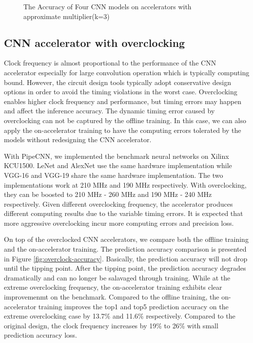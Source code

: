 \begin{figure}
        \center
        \qquad
        \caption{The Accuracy of Four CNN models on accelerators with approximate multiplier(k=3)}
        \label{fig:k3-approximate-mltiplier}
\end{figure}

\subsection{CNN accelerator with overclocking}
Clock frequency is almost proportional to the performance of the CNN accelerator 
especially for large convolution operation which is typically computing bound. 
However, the circuit design tools typically adopt conservative design options 
in order to avoid the timing violations in the worst case. Overclocking enables 
higher clock frequency and performance, but timing errors may happen and affect 
the inference accuracy. The dynamic timing error caused by overclocking 
can not be captured by the offline training. In this case, we can also apply the on-accelerator 
training to have the computing errors tolerated by the models without 
redesigning the CNN accelerator.

With PipeCNN, we implemented the benchmark neural networks on Xilinx KCU1500. 
LeNet and AlexNet use the same hardware implementation 
while VGG-16 and VGG-19 share the same hardware implementation. 
The two implementations work at 210 MHz and 190 MHz respectively.
With overclocking, they can be boosted to 210 MHz - 260 MHz and 
190 MHz - 240 MHz respectively. Given different overclocking frequency, 
the accelerator produces different computing results due to the variable
timing errors. It is expected that more aggressive overclocking incur 
more computing errors and precision loss. 

On top of the overclocked CNN accelerators, we compare both the offline training and the on-accelerator training.
The prediction accuracy comparison is presented in Figure \ref{fig:overclock-accuracy}. 
Basically, the prediction accuracy will not drop until the tipping point. After the tipping point, the 
prediction accuracy degrades dramatically and can no longer be salavaged through training.
While at the extreme overclocking frequency, the on-accelerator training exhibits clear 
improvemenmt on the benchmark. Compared to the offline training, 
the on-accelerator training improves the top1 and top5 prediction accuracy 
on the extreme overclocking case by 13.7\% and 11.6\% respectively.
Compared to the original design, the clock frequency 
increases by 19\% to 26\% with small prediction accuracy loss. 

